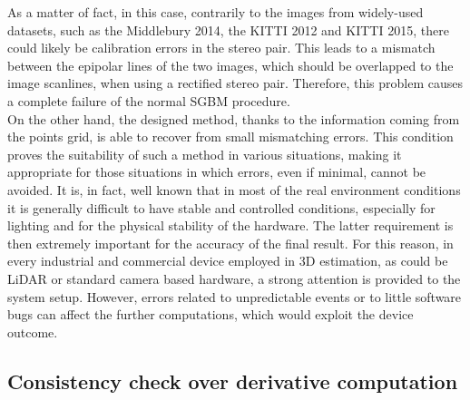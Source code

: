 As a matter of fact, in this case, contrarily to the images from widely-used datasets, such as the Middlebury 2014, the KITTI 2012 and KITTI 2015, there could likely be calibration errors in the stereo pair.
This leads to a mismatch between the epipolar lines of the two images, which should be overlapped to the image scanlines, when using a rectified stereo pair. 
Therefore, this problem causes a complete failure of the normal SGBM procedure.\\
On the other hand, the designed method, thanks to the information coming from the points grid, is able to recover from small mismatching errors.
This condition proves the suitability of such a method in various situations, making it appropriate for those situations in which errors, even if minimal, cannot be avoided. 
It is, in fact, well known that in most of the real environment conditions it is generally difficult to have stable and controlled conditions, especially for lighting and for the physical stability of the hardware. 
The latter requirement is then extremely important for the accuracy of the final result. 
For this reason, in every industrial and commercial device employed in 3D estimation, as could be LiDAR or standard camera based hardware, a strong attention is provided to the system setup. 
However, errors related to unpredictable events or to little software bugs can affect the further computations, which would exploit the device outcome. 

\subsection{Consistency check over derivative computation}
\label{subsection:result-consistency-check}

